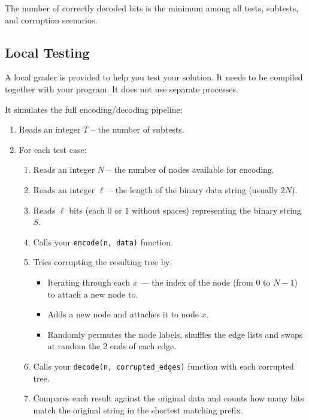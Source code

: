 \documentclass[12pt]{article}
\begin{document}
The number of correctly decoded bits is the minimum among all tests, subtests, and corruption scenarios.

\newpage

\subsection{Local Testing}

A local grader is provided to help you test your solution. It needs to be compiled together with your program. It does not use separate processes.

It simulates the full encoding/decoding pipeline:

\begin{enumerate}
    \item Reads an integer $T$ -- the number of subtests.
    \item For each test case:
    \begin{enumerate}
        \item Reads an integer $N$ -- the number of nodes available for encoding.
        \item Reads an integer $\ell$ -- the length of the binary data string (usually $2N$).
        \item Reads $\ell$ bits (each $0$ or $1$ without spaces) representing the binary string $S$.
        \item Calls your \verb|encode(n, data)| function.
        \item Tries corrupting the resulting tree by:
        \begin{itemize}
            \item Iterating through each $x$ — the index of the node (from $0$ to $N-1$) to attach a new node to. \vspace{0.4em}
            \item Adds a new node and attaches it to node $x$. \vspace{0.4em}
            \item Randomly permutes the node labels, shuffles the edge lists and swaps at random the 2 ends of each edge. \vspace{0.4em}
        \end{itemize}
        \item Calls your \verb|decode(n, corrupted_edges)| function with each corrupted tree.
        \item Compares each result against the original data and counts how many bits match the original string in the shortest matching prefix.
    \end{enumerate}
\end{enumerate}
\end{document}
